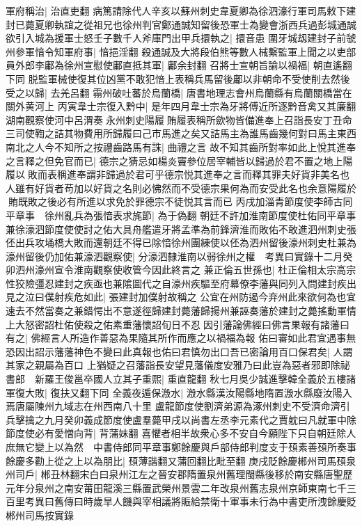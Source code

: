 軍府稱治|{
	治直吏翻}
病篤請除代人辛亥以蘇州刺史韋夏卿為徐泗濠行軍司馬敕下建封已薨夏卿執誼之從祖兄也徐州判官鄭通誠知留後恐軍士為變會浙西兵過彭城通誠欲引入城為援軍士怒壬子數千人斧庫門出甲兵擐執之|{
	擐音患}
圍牙城刼建封子前虢州參軍愔令知軍府事|{
	愔挹淫翻}
殺通誠及大將段伯熊等數人械繫監軍上聞之以吏部員外郎李鄘為徐州宣慰使鄘直抵其軍|{
	鄘余封翻}
召將士宣朝旨諭以禍福|{
	朝直遙翻下同}
脱監軍械使復其位凶黨不敢犯愔上表稱兵馬留後鄘以非朝命不受使削去然後受之以歸|{
	去羌呂翻}
霛州破吐蕃於烏蘭橋|{
	唐書地理志會州烏蘭縣有烏蘭關橋當在關外黄河上}
丙寅韋士宗復入黔中|{
	是年四月韋士宗為牙將傅近所逐黔音禽又其廉翻}
湖南觀察使河中呂渭奏永州刺史陽履賄履表稱所歛物皆備進奉上召詣長安丁丑命三司使鞫之詰其物費用所歸履曰己市馬進之矣又詰馬主為誰馬齒幾何對曰馬主東西南北之人今不知所之按禮齒路馬有誅|{
	曲禮之言}
故不知其齒所對率如此上悅其進奉之言釋之但免官而已|{
	德宗之猜忌如楊炎竇參位居宰輔皆以歸過於君不置之地上陽履以敗而表稱進奉謂非歸過於君可乎德宗悦其進奉之言而釋其罪夫好貨非美名也人雖有好貨者苟加以好貨之名則必怫然而不受德宗果何為而安受此名也余意陽履於賄既敗之後必有所進以求免於罪德宗不徒悦其言而已}
丙戌加淄青節度使李師古同平章事　徐州亂兵為張愔表求旄節|{
	為于偽翻}
朝廷不許加淮南節度使杜佑同平章事兼徐濠泗節度使使討之佑大具舟艦遣牙將孟準為前鋒濟淮而敗佑不敢進泗州刺史張伾出兵攻埇橋大敗而還朝廷不得已除愔徐州團練使以伾為泗州留後濠州刺史杜兼為濠州留後仍加佑兼濠泗觀察使|{
	分濠泗隸淮南以弱徐州之權　考異曰實錄十二月癸卯泗州濠州宣令淮南觀察使收管今因此終言之}
兼正倫五世孫也|{
	杜正倫相太宗高宗}
性狡險彊忍建封之疾亟也兼隂圖代之自濠州疾驅至府幕僚李藩與同列入問建封疾出見之泣曰僕射疾危如此|{
	張建封加僕射故稱之}
公宜在州防遏今弃州此來欲何為也宜速去不然當奏之兼錯愕出不意遂徑歸建封薨藩歸揚州兼誣奏藩於建封之薨搖動軍情上大怒密詔杜佑使殺之佑素重藩懷詔旬日不忍因引藩論佛經曰佛言果報有諸藩曰有之|{
	佛經言人所造作善惡為果隨其所作而應之以禍福為報}
佑曰審如此君宜遇事無恐因出詔示藩藩神色不變曰此真報也佑曰君慎勿出口吾已密論用百口保君矣|{
	人謂其家之親屬為百口}
上猶疑之召藩詣長安望見藩儀度安雅乃曰此豈為惡者邪即除祕書郎　新羅王俊邕卒國人立其子重熙|{
	重直龍翻}
秋七月吳少誠進擊韓全義於五樓諸軍復大敗|{
	復扶又翻下同}
全義夜遁保溵水|{
	溵水縣漢汝陽縣地隋置溵水縣廢汝陽入焉唐屬陳州九域志在州西南八十里}
盧龍節度使劉濟弟源為涿州刺史不受濟命濟引兵擊擒之九月癸卯義成節度使盧羣薨甲戌以尚書左丞李元素代之賈躭曰凡就軍中除節度使必有愛憎向背|{
	背蒲妹翻}
喜懼者相半故衆心多不安自今願陛下只自朝廷除人庶無它變上以為然　中書侍郎同平章事鄭餘慶與戶部侍郎判度支于䪹素善䪹所奏事餘慶多勸上從之上以為朋比|{
	䪹薄諧翻又蒲回翻比毗至翻}
庚戌貶餘慶郴州司馬䪹泉州司戶|{
	郴丑林翻宋白曰泉州江左之晉安郡隋置泉州舊理閩縣後移於南安縣唐聖歷元年分泉州之南安莆田龍溪三縣置武榮州景雲二年改泉州舊志泉州京師東南七千三百里考異曰舊傳曰時歲旱人饑與宰相議將賑給禁衛十軍事未行為中書吏所洩餘慶貶郴州司馬按實錄}


